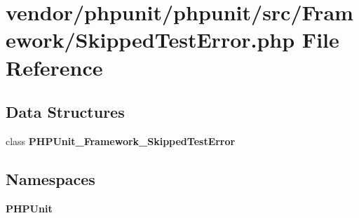 \section{vendor/phpunit/phpunit/src/\+Framework/\+Skipped\+Test\+Error.php File Reference}
\label{_skipped_test_error_8php}
\subsection*{Data Structures}
\begin{DoxyCompactItemize}
\item 
class {\bf P\+H\+P\+Unit\+\_\+\+Framework\+\_\+\+Skipped\+Test\+Error}
\end{DoxyCompactItemize}
\subsection*{Namespaces}
\begin{DoxyCompactItemize}
\item 
 {\bf P\+H\+P\+Unit}
\end{DoxyCompactItemize}
